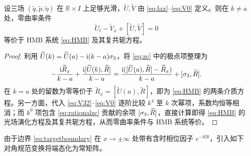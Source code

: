 \begin{proposition}\label{prop:zc}
设三场 $(\widetilde q,\widetilde p,\widetilde\eta)$ 在 $\mathbb R\times I$ 上足够光滑，$\widetilde U,\widetilde V$ 由 \eqref{eq:lax}--\eqref{eq:V0} 定义。则在 $k\ne a$ 处，零曲率条件
\begin{equation}\label{eq:zc}
\widetilde U_t-\widetilde V_x+[\widetilde U,\widetilde V]=0
\end{equation}
等价于 HMB 系统 \eqref{eq:HMB} 及其复共轭方程。
\end{proposition}
\begin{proof}
利用 $\widetilde U(k)=\widetilde U(a)-\mathrm{i}(k-a)\sigma_3$，将 \eqref{eq:zc} 中的极点项整理为
\begin{equation}\label{eq:rationalzc}
-\dfrac{\mathrm{i} \widetilde R_x}{k-a}+\dfrac{\mathrm{i}[\widetilde U(k),\widetilde R]}{k-a}
=\dfrac{\mathrm{i}([\widetilde U(a),\widetilde R]-\widetilde R_x)}{k-a}+[\sigma_3,\widetilde R].
\end{equation}
在 $k=a$ 处的留数为零等价于 $\widetilde R_x=[\widetilde U(a),\widetilde R]$，即为 \eqref{eq:HMB} 的两条介质方程。另一方面，代入 \eqref{eq:V32}--\eqref{eq:V0} 逐阶比较 $k^4$ 至 $k$ 次幂项，系数均恒等相消；而 $k^0$ 项包含 \eqref{eq:rationalzc} 贡献的余项 $[\sigma_3,\widetilde R]$，直接计算即得 \eqref{eq:HMB} 的光场演化方程及其复共轭方程，从而零曲率条件与 HMB 系统等价。
\end{proof}

由于边界 \eqref{eq:targetboundary} 在 $x\to\pm\infty$ 处带有含时相位因子 $e^{-\ii\Omega t}$，引入如下对角规范变换将端态化为常矩阵。

